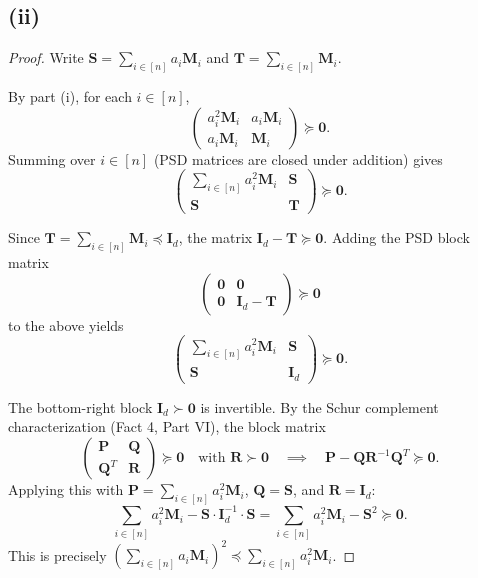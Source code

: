 \documentclass[12pt]{article}
\begin{document}
\subsection*{(ii)}

\begin{proof}
Write $\mathbf{S} = \sum_{i \in [n]} a_i \mathbf{M}_i$ and $\mathbf{T} = \sum_{i \in [n]} \mathbf{M}_i$.

By part (i), for each $i \in [n]$,
\[
\begin{pmatrix} a_i^2 \mathbf{M}_i & a_i \mathbf{M}_i \\ a_i \mathbf{M}_i & \mathbf{M}_i \end{pmatrix} \succeq \mathbf{0}.
\]
Summing over $i \in [n]$ (PSD matrices are closed under addition) gives
\[
\begin{pmatrix} \sum_{i \in [n]} a_i^2 \mathbf{M}_i & \mathbf{S} \\ \mathbf{S} & \mathbf{T} \end{pmatrix} \succeq \mathbf{0}.
\]

Since $\mathbf{T} = \sum_{i \in [n]} \mathbf{M}_i \preceq \mathbf{I}_d$, the matrix $\mathbf{I}_d - \mathbf{T} \succeq \mathbf{0}$. Adding the PSD block matrix
\[
\begin{pmatrix} \mathbf{0} & \mathbf{0} \\ \mathbf{0} & \mathbf{I}_d - \mathbf{T} \end{pmatrix} \succeq \mathbf{0}
\]
to the above yields
\[
\begin{pmatrix} \sum_{i \in [n]} a_i^2 \mathbf{M}_i & \mathbf{S} \\ \mathbf{S} & \mathbf{I}_d \end{pmatrix} \succeq \mathbf{0}.
\]

The bottom-right block $\mathbf{I}_d \succ \mathbf{0}$ is invertible. By the Schur complement characterization (Fact 4, Part VI), the block matrix
\[
\begin{pmatrix} \mathbf{P} & \mathbf{Q} \\ \mathbf{Q}^T & \mathbf{R} \end{pmatrix} \succeq \mathbf{0} \quad \text{with } \mathbf{R} \succ \mathbf{0} \quad \implies \quad \mathbf{P} - \mathbf{Q}\mathbf{R}^{-1}\mathbf{Q}^T \succeq \mathbf{0}.
\]
Applying this with $\mathbf{P} = \sum_{i \in [n]} a_i^2 \mathbf{M}_i$, $\mathbf{Q} = \mathbf{S}$, and $\mathbf{R} = \mathbf{I}_d$:
\[
\sum_{i \in [n]} a_i^2 \mathbf{M}_i - \mathbf{S} \cdot \mathbf{I}_d^{-1} \cdot \mathbf{S} = \sum_{i \in [n]} a_i^2 \mathbf{M}_i - \mathbf{S}^2 \succeq \mathbf{0}.
\]
This is precisely $\left(\sum_{i \in [n]} a_i \mathbf{M}_i\right)^2 \preceq \sum_{i \in [n]} a_i^2 \mathbf{M}_i$.
\end{proof}
\end{document}
